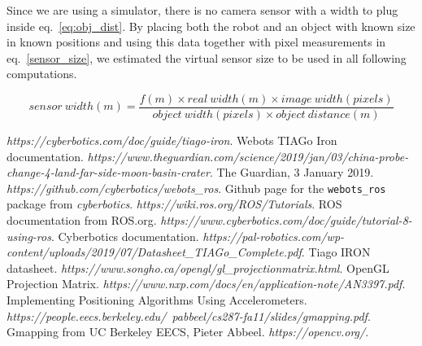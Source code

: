 \documentclass[a4paper]{article}
\begin{document}
	Since we are using a simulator, there is no camera sensor with a width to
	plug inside eq.~\ref{eq:obj_dist}. By placing both the robot and an object
	with known size in known positions and using this data together with pixel
	measurements in eq.~\ref{sensor_size}, we estimated the virtual sensor size
	to be used in all following computations.

	\begin{equation}\label{sensor_size}
		sensor~width(m) = 
		\frac{f(m) \times real~width(m) \times image~width(pixels)}
			{object~width(pixels) \times object~distance(m)}
	\end{equation}

	\newpage
	
	\begin{thebibliography}{19}
		\textit{https://cyberbotics.com/doc/guide/tiago-iron}. \newline
		Webots TIAGo Iron documentation.
		\textit{https://www.theguardian.com/science/2019/jan/03/china-probe-change-4-land-far-side-moon-basin-crater}. \newline
		The Guardian, 3 January 2019.
		\textit{https://github.com/cyberbotics/webots\_ros}. \newline
		Github page for the \texttt{webots\_ros} package from \textit{cyberbotics}.
		\textit{https://wiki.ros.org/ROS/Tutorials}. \newline
		ROS documentation from ROS.org.
		\textit{https://www.cyberbotics.com/doc/guide/tutorial-8-using-ros}. \newline
		Cyberbotics documentation.
		\textit{https://pal-robotics.com/wp-content/uploads/2019/07/Datasheet\_TIAGo\_Complete.pdf}. \newline
		Tiago IRON datasheet.
		\textit{https://www.songho.ca/opengl/gl\_projectionmatrix.html}. \newline
		OpenGL Projection Matrix.
		\textit{https://www.nxp.com/docs/en/application-note/AN3397.pdf}. \newline
		Implementing Positioning Algorithms Using Accelerometers.
		\textit{https://people.eecs.berkeley.edu/~pabbeel/cs287-fa11/slides/gmapping.pdf}. \newline
		Gmapping from UC Berkeley EECS, Pieter Abbeel.
		\textit{https://opencv.org/}. \newline

\end{thebibliography}
\end{document}
